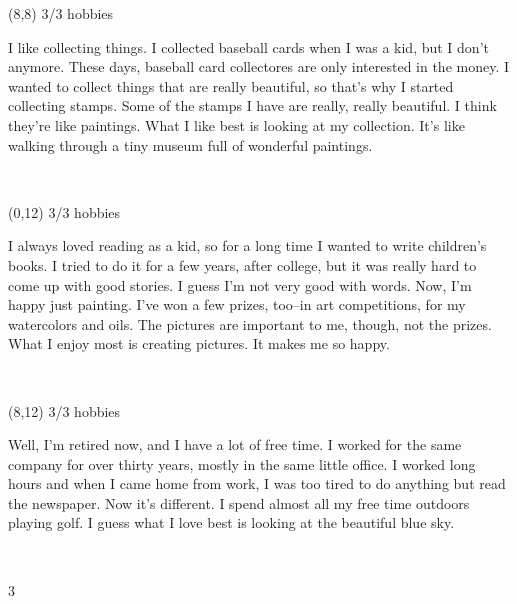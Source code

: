 \documentclass[a4paper]{article}
\newcommand{\mycard}[5]{%
	\vspace{0.1cm}
	\small #1 #2
	\par
	\parbox[t][6.7cm][c]{9.5cm}{%
	\hspace{0.1cm} \large#3 \\
	\normalsize#4 #5
	}
}
\begin{document}
\begin{textblock}{8}(8,8)
\mycard{3/3}{hobbies}{\parbox{9.0cm}{
I like collecting things. I collected baseball cards when I was a kid, but I don't anymore. These days, baseball card collectores are only interested in the money. I wanted to collect things that are really beautiful, so that's why I started collecting stamps. Some of the stamps I have are really, really beautiful. I think they're like paintings. What I like best is looking at my collection. It's like walking through a tiny museum full of wonderful paintings.
}}{}{} 
\end{textblock}

\begin{textblock}{8}(0,12)
\mycard{3/3}{hobbies}{\parbox{9.0cm}{
I always loved reading as a kid, so for a long time I wanted to write children's books. I tried to do it for a few years, after college, but it was really hard to come up with good stories. I guess I'm not very good with words. Now, I'm happy just painting. I've won a few prizes, too--in art competitions, for my watercolors and oils. The pictures are important to me, though, not the prizes. What I enjoy most is creating pictures. It makes me so happy.
}}{}{} 
\end{textblock}

\begin{textblock}{8}(8,12)
\mycard{3/3}{hobbies}{\parbox{9.0cm}{
Well, I'm retired now, and I have a lot of free time. I worked for the same company for over thirty years, mostly in the same little office. I worked long hours and when I came home from work, I was too tired to do anything but read the newspaper. Now it's different. I spend almost all my free time outdoors playing golf. I guess what I love best is looking at the beautiful blue sky.
}}{}{} 
\end{textblock}

\begin{tiny}3\end{tiny}\\
\newpage
\end{document}
